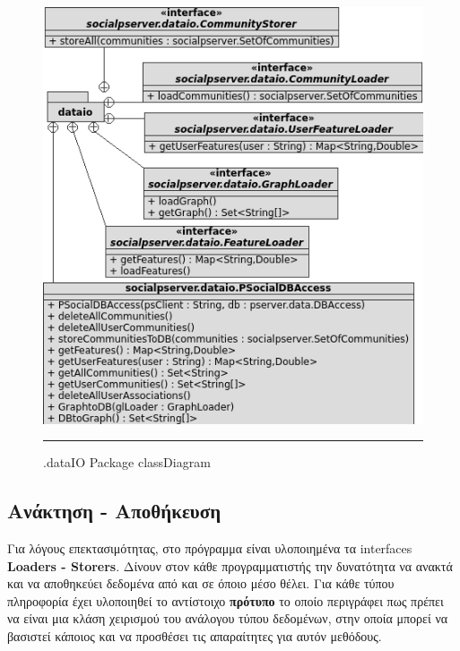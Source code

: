 \begin{figure}[htbp]
  \hspace{-8.0em}    
    \includegraphics[scale=1.3]{Figures/dataIOClassDiagram.png}
	\rule{35em}{0.5pt}  %
	\caption[dataIOClassDiagram]{.dataIO Package classDiagram}
  \label{fig:dataIOClassDiagram}  
\end{figure}

\clearpage

\subsection{Ανάκτηση - Αποθήκευση}
\label{Loaders - Storers}
\noindent
Για λόγους επεκτασιμότητας, στο πρόγραμμα είναι υλοποιημένα τα   interfaces \textbf{Loaders - Storers}. Δίνουν στον κάθε προγραμματιστής 
την δυνατότητα να ανακτά και να αποθηκεύει δεδομένα από και σε όποιο μέσο θέλει. 
Για κάθε τύπου πληροφορία έχει υλοποιηθεί το αντίστοιχο \textbf{πρότυπο} το οποίο περιγράφει πως 
πρέπει να είναι μια κλάση χειρισμού του ανάλογου τύπου δεδομένων, 
στην οποία μπορεί να βασιστεί κάποιος και να προσθέσει τις απαραίτητες για αυτόν μεθόδους.\\


